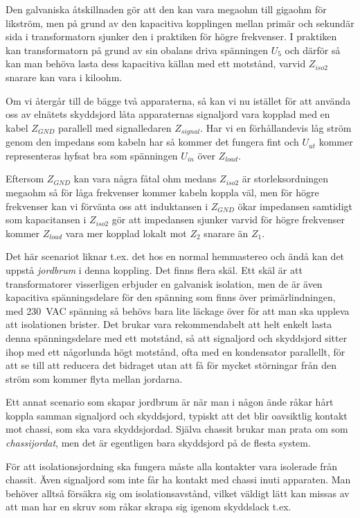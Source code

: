 Den galvaniska åtskillnaden gör att den kan vara megaohm till gigaohm för
likström, men på grund av den kapacitiva kopplingen mellan primär och sekundär
sida i transformatorn sjunker den i praktiken för högre frekvenser.
I praktiken kan transformatorn på grund av sin obalans driva spänningen \(U_5\)
och därför så kan man behöva lasta dess kapacitiva källan med ett motstånd,
varvid \(Z_{iso2}\) snarare kan vara i kiloohm.

Om vi återgår till de bägge två apparaterna, så kan vi nu istället för att
använda oss av elnätets skyddsjord låta apparaternas signaljord vara kopplad
med en kabel \(Z_{GND}\) parallell med signalledaren \(Z_{signal}\).
Har vi en förhållandevis låg ström genom den impedans som kabeln har så
kommer det fungera fint och \(U_{ut}\) kommer representeras hyfsat bra som
spänningen \(U_{in}\) över \(Z_{load}\).

Eftersom \(Z_{GND}\) kan vara några fåtal ohm medans \(Z_{iso2}\) är
storleksordningen megaohm så för låga frekvenser kommer kabeln koppla väl,
men för högre frekvenser kan vi förvänta oss att induktansen i \(Z_{GND}\) ökar
impedansen samtidigt som kapacitansen i \(Z_{iso2}\) gör att impedansen sjunker
varvid för högre frekvenser kommer \(Z_{load}\) vara mer kopplad lokalt mot \(Z_{2}\) snarare än \(Z_{1}\).

Det här scenariot liknar t.ex. det hos en normal hemmastereo och ändå kan det
uppstå \emph{jordbrum} i denna koppling.
Det finns flera skäl.
Ett skäl är att transformatorer visserligen erbjuder en galvanisk isolation,
men de är även kapacitiva spänningsdelare för den spänning som finns över
primärlindningen, med 230~VAC spänning så behövs bara lite läckage över för att
man ska uppleva att isolationen brister.
Det brukar vara rekommendabelt att helt enkelt lasta denna spänningsdelare med
ett motstånd, så att signaljord och skyddsjord sitter ihop med ett någorlunda
högt motstånd, ofta med en kondensator parallellt, för att se till att reducera
det bidraget utan att få för mycket störningar från den ström som kommer flyta
mellan jordarna.

Ett annat scenario som skapar jordbrum är när man i någon ände råkar hårt
koppla samman signaljord och skyddsjord, typiskt att det blir oavsiktlig
kontakt mot chassi, som ska vara skyddsjordad.
Själva chassit brukar man prata om som \emph{chassijordat}, men det är
egentligen bara skyddsjord på de flesta system.

För att isolationsjordning ska fungera måste alla kontakter vara isolerade
från chassit.
Även signaljord som inte får ha kontakt med chassi inuti apparaten.
Man behöver alltså försäkra sig om isolationsavstånd, vilket väldigt lätt kan
missas av att man har en skruv som råkar skrapa sig igenom skyddslack t.ex.

